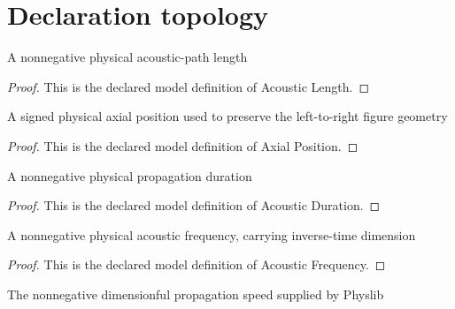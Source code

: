 \section{Declaration topology}
\begin{definition}
  \label{def:physics:phyx-mini-0211:phyxminiproblems-problemphyxmini0211-acousticlength}
  A nonnegative physical acoustic-path length
\end{definition}
\begin{proof}
  This is the declared model definition of Acoustic Length.
\end{proof}
\begin{definition}
  \label{def:physics:phyx-mini-0211:phyxminiproblems-problemphyxmini0211-axialposition}
  A signed physical axial position used to preserve the left-to-right figure geometry
\end{definition}
\begin{proof}
  This is the declared model definition of Axial Position.
\end{proof}
\begin{definition}
  \label{def:physics:phyx-mini-0211:phyxminiproblems-problemphyxmini0211-acousticduration}
  A nonnegative physical propagation duration
\end{definition}
\begin{proof}
  This is the declared model definition of Acoustic Duration.
\end{proof}
\begin{definition}
  \label{def:physics:phyx-mini-0211:phyxminiproblems-problemphyxmini0211-acousticfrequency}
  A nonnegative physical acoustic frequency, carrying inverse-time dimension
\end{definition}
\begin{proof}
  This is the declared model definition of Acoustic Frequency.
\end{proof}
\begin{definition}
  \label{def:physics:phyx-mini-0211:phyxminiproblems-problemphyxmini0211-acousticspeed}
  The nonnegative dimensionful propagation speed supplied by Physlib
\end{definition}
